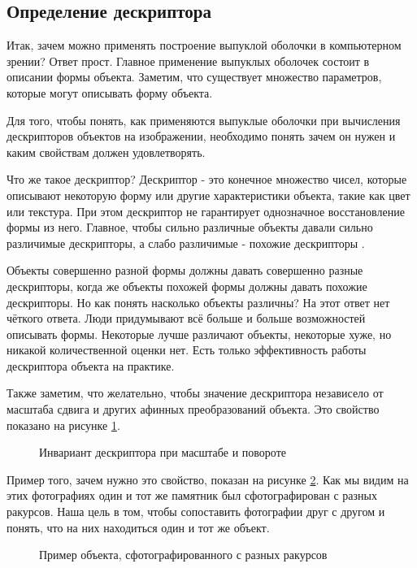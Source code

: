 \subsection{Определение дескриптора}

Итак, зачем можно применять построение выпуклой оболочки в компьютерном зрении? Ответ прост. Главное применение выпуклых оболочек состоит в описании формы объекта. Заметим, что существует множество параметров, которые могут описывать форму объекта.

Для того, чтобы понять, как применяются выпуклые оболочки при вычисления дескрипторов объектов на изображении, необходимо понять зачем он нужен и каким свойствам должен удовлетворять.

Что же такое дескриптор? Дескриптор - это конечное множество чисел, которые описывают некоторую форму или другие характеристики объекта, такие как цвет или текстура. При этом дескриптор не гарантирует однозначное восстановление формы из него. Главное, чтобы сильно различные объекты давали сильно различимые дескрипторы, а слабо различимые - похожие дескрипторы \cite{morse2000lecture}.

Объекты совершенно разной формы должны давать совершенно разные дескрипторы, когда же объекты похожей формы должны давать похожие дескрипторы. Но как понять насколько объекты различны? На этот ответ нет чёткого ответа. Люди придумывают всё больше и больше возможностей описывать формы. Некоторые лучше различают объекты, некоторые хуже, но никакой количественной оценки нет. Есть только эффективность работы дескриптора объекта на практике.

Также заметим, что желательно, чтобы значение дескриптора независело от масштаба сдвига и других афинных преобразований объекта\cite{azadeh2013lecture}. Это свойство показано на рисунке \ref{img:descriptor_invariant}.

\begin{figure}[H]
	\centering
	
	\caption{Инвариант дескриптора при масштабе и повороте}
	\label{img:descriptor_invariant}
\end{figure}

Пример того, зачем нужно это свойство, показан на рисунке \ref{img:photos}. Как мы видим на этих фотографиях один и тот же памятник был сфотографирован с разных ракурсов. Наша цель в том, чтобы сопоставить фотографии друг с другом и понять, что на них находиться один и тот же объект.

\begin{figure}[H]
	{\centering
		\hfill
		\hfill
		\hfill
	}
	\caption{Пример объекта, сфотографированного с разных ракурсов}
	\label{img:photos}
\end{figure}

